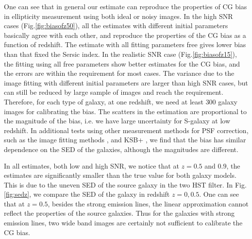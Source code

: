 \documentclass[useAMS,usenatbib]{mn2e}
\begin{document}
One can see that in general our estimate can reproduce the properties of CG bias
in ellipticity measurement using both ideal or noisy images.
In the high SNR cases (Fig.\ref{fig:biasofz50}), all the estimates with different
initial parameters basically agree with each other, and reproduce the
properties of the CG bias as a function of redshift. The estimate with
all fitting parameters free gives lower bias than that fixed the Sersic index.
In the realistic SNR case (Fig.\ref{fig:biasofz15}),
the fitting using all free parameters show better estimates for the CG
bias, and the errors are within the requirement for most cases.
The variance due to the image fitting with different initial parameters
are larger than high SNR cases, but can still be reduced by large sample
of images and reach the requirement. Therefore, for each type of galaxy,
at one redshift, we need at least $300$ galaxy images for calibrating the
bias. The scatters in the estimation are proportional to the magnitude of the
bias, i.e. we have large uncertainty for S-galaxy at low redshift.
In additional tests using other measurement methods for PSF
correction, such as the image fitting methods
\citep[e.g.][]{2007MNRAS.382..315M,2008MNRAS.390..149K,2013MNRAS.429.2858M},
and KSB+ \citep[e.g.][]{1998ApJ...504..636H,2006MNRAS.368.1323H}, we
find that the bias has similar dependence on the SED of the galaxies,
although the magnitudes are different.

In all estimates, both low and high SNR, we notice that at $z=0.5$ and $0.9$, the estimates are
significantly smaller than the true value for both galaxy models. This is
due to the uneven SED of the source galaxy in the two HST filter. In
Fig.\ref{fig:sedz}, we compare the SED of the galaxy in redshift
$z=0,0.5$. One can see that at $z=0.5$, besides the strong emission
lines, the linear approximation cannot reflect the properties of the
source galaxies. Thus for the galaxies with strong emission lines, two
wide band images are certainly not sufficient to calibrate the CG bias.
\end{document}
